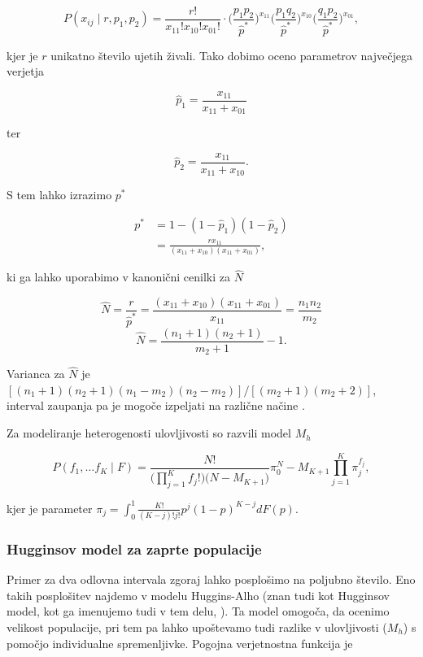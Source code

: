 \[
P(x_{ij} \mid r, p_1, p_2) = \frac{r!}{x_{11}! x_{10}! x_{01}!} \cdot \Big(\frac{p_1 p_2}{\hat{p}^{*}}\Big)^{x_{11}} \Big(\frac{p_1 q_2}{\hat{p}^{*}}\Big)^{x_{10}} \Big(\frac{q_1 p_2}{\hat{p}^{*}}\Big)^{x_{01}},
\]

kjer je $r$ unikatno število ujetih živali. Tako dobimo oceno parametrov največjega verjetja


\[
\hat{p}_1 = \frac{x_{11}}{x_{11} + x_{01}}
\]

ter

\[
\hat{p}_2 = \frac{x_{11}}{x_{11} + x_{10}}.
\]

S tem lahko izrazimo $p^{*}$

\begin{align*}
p^* &= 1 - (1-\hat{p}_1)(1-\hat{p}_2) \\[5pt]
    &= \frac{r x_{11}}{(x_{11} + x_{10})(x_{11} + x_{01})},
\end{align*}

ki ga lahko uporabimo v kanonični cenilki za $\hat{N}$

\[
\hat{N} = \frac{r}{\hat{p}^{*}} = \frac{(x_{11} + x_{10})(x_{11} + x_{01})}{x_{11}} = \frac{n_1 n_2}{m_2}
\]
\[
\hat{N} = \frac{(n_1 + 1)(n_2 + 1)}{m_2 + 1} - 1.
\]

Varianca za $\hat{N}$ je $[(n_1 + 1)(n_2 + 1)(n_1 - m_2)(n_2 - m_2)]/[(m_2 + 1)(m_2 + 2)]$, interval zaupanja pa je mogoče izpeljati na različne načine \citep{williams_analysis_2002}.

Za modeliranje heterogenosti ulovljivosti so razvili model $M_h$ \citep{otis_statistical_1978}

\[
P(f_1, \ldots f_K \mid F) = \frac{N!}{\big(\prod_{j=1}^{K} f_j !\big)\big(N - M_{K+1}\big)} \pi_{0}^N-M_{K+1} \prod_{j=1}^{K} \pi_{j}^{f_j},
\]

kjer je parameter $\pi_j = \int_{0}^{1} \frac{K!}{(K-j)!j!} p^j (1-p)^{K-j} dF(p)$.


\subsubsection[\bfseries Hugginsov model za zaprte populacije]{Hugginsov model za zaprte populacije}
Primer za dva odlovna intervala zgoraj lahko posplošimo na poljubno število. Eno takih posplošitev najdemo v modelu Huggins-Alho (znan tudi kot Hugginsov model, kot ga imenujemo tudi v tem delu, \citet{huggins_statistical_1989}). Ta model omogoča, da ocenimo velikost populacije, pri tem pa lahko upoštevamo tudi razlike v ulovljivosti ($M_h$) s pomočjo individualne spremenljivke. Pogojna verjetnostna funkcija je

